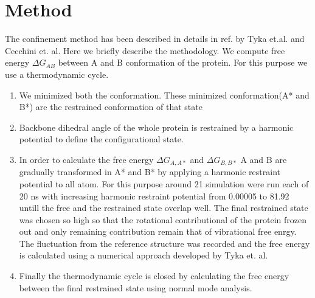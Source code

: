 \documentclass[12pt]{article}
\begin{document}


\section{Method}

The confinement method has been described in details in ref. by Tyka et.al. and Cecchini et. al. Here we briefly describe the methodology.
We compute free energy $\Delta G_{AB}$ between A and B conformation of the protein. For this purpose we use a thermodynamic cycle.
\begin{enumerate}

\item  We minimized both the conformation. These minimized conformation(A* and B*) are the restrained conformation of that state

\item Backbone dihedral angle of the whole protein is restrained by a harmonic potential to define the configurational state.

\item  In order to calculate the free energy $\Delta G_{A,A*}$ and  $\Delta G_{B,B*}$ A and B are gradually transformed in A* and B* by applying 
a harmonic restraint potential to all atom. For this purpose around 21 simulation were run each of 20 ns with increasing harmonic 
restraint potential from 0.00005 to 81.92 untill the free and the restrained state overlap well. The final restrained state was chosen so high so that
the rotational contributional of the protein frozen out and only remaining contribution remain that of vibrational free enrgy. The fluctuation from 
the reference structure was recorded and the free energy is calculated using a numerical approach developed by Tyka et. al. 

\item  Finally the thermodynamic cycle is closed by calculating the free energy between the final restrained state using normal mode analysis.  

\end{enumerate}
\end{document}

